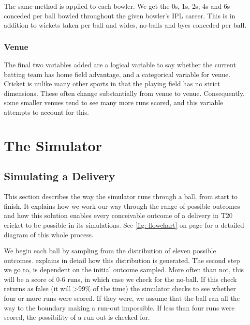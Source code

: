 The same method is applied to each bowler. We get the 0s, 1s, 2s, 4s and 6s conceded per ball bowled throughout the given bowler’s IPL career. This is in addition to wickets taken per ball and wides, no-balls and byes conceded per ball. 

\subsubsection{Venue}

The final two variables added are a logical variable to say whether the current batting team has home field advantage, and a categorical variable for venue. Cricket is unlike many other sports in that the playing field has no strict dimensions. These often change substantially from venue to venue. Consequently, some smaller venues tend to see many more runs scored, and this variable attempts to account for this.

\section{The Simulator}
\label{sec: sim}

\subsection{Simulating a Delivery}

This section describes the way the simulator runs through a ball, from start to finish. It explains how we work our way through the range of possible outcomes and how this solution enables every conceivable outcome of a delivery in T20 cricket to be possible in its simulations.\footnotemark{} See \cref{fig: flowchart} on page \pageref{fig: flowchart} for a detailed diagram of this whole process.


We begin each ball by sampling from the distribution of eleven possible outcomes.  explains in detail how this distribution is generated. The second step we go to, is dependent on the initial outcome sampled. More often than not, this will be a score of 0-6 runs, in which case we check for the no-ball. If this check returns as false (it will >99\% of the time) the simulator checks to see whether four or more runs were scored. If they were, we assume that the ball ran all the way to the boundary making a run-out impossible. If less than four runs were scored, the possibility of a run-out is checked for.

